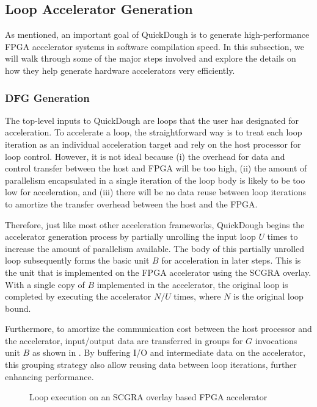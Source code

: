 \subsection{Loop Accelerator Generation}
As mentioned, an important goal of QuickDough is to generate high-performance FPGA accelerator systems in software compilation speed.  In this subsection, we will walk through some of the major steps involved and explore the details on how they help generate hardware accelerators very efficiently.


\subsubsection{DFG Generation}
The top-level inputs to QuickDough are loops that the user has designated for acceleration.
To accelerate a loop, the straightforward way is to treat each loop iteration as an individual acceleration target and rely on the host processor for loop control.
However, it is not ideal because (i) the overhead for data and control transfer between the host and FPGA will be too high, (ii) the amount of parallelism encapsulated in a single iteration of the loop body is likely to be too low for acceleration, and (iii) there will be no data reuse between loop iterations to amortize the transfer overhead between the host and the FPGA.

Therefore, just like most other acceleration frameworks, QuickDough begins the accelerator generation process by partially unrolling the input loop $U$ times to increase the amount of parallelism available.
The body of this partially unrolled loop subsequently forms the basic unit $B$ for acceleration in later steps.
This is the unit that is implemented on the FPGA accelerator using the SCGRA overlay.
With a single copy of $B$ implemented in the accelerator, the original loop is completed by executing the accelerator $N/U$ times, where $N$ is the original loop bound.

Furthermore, to amortize the communication cost between the host processor and the accelerator, input/output data are transferred in groups for $G$ invocations unit $B$ as shown in .
By buffering I/O and intermediate data on the accelerator, this grouping strategy also allow reusing data between loop iterations, further enhancing performance.

\begin{figure}
\caption{Loop execution on an SCGRA overlay based FPGA accelerator}
\label{fig:blocking-and-dfg-gen}
\end{figure}

